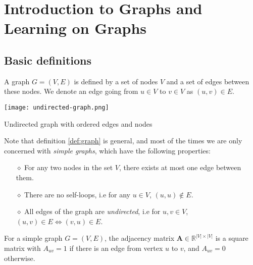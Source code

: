 \section{Introduction to Graphs and Learning on Graphs}\label{sec:intro-graph}
\subsection{Basic definitions}

\begin{definition}[Graph] \label{def:graph}
A graph $G = (V, E)$ is defined by a set of nodes $V$ and a set of edges between these nodes. We denote an edge going from $u \in V$ to $v \in V$ as $(u, v) \in E$.
\end{definition}
\begin{marginfigure}
	\texttt{[image: undirected-graph.png]}
	\caption{Undirected graph with ordered edges and nodes}
	\label{fig:undirected-graph}
\end{marginfigure}
Note that definition \ref{def:graph} is general, and most of the times we are only concerned with \textit{simple graphs}, which have the following properties:
\begin{itemize}
	\item[$\diamond$] For any two nodes in the set $V$, there exists at most one edge between them.
	\item[$\diamond$] There are no self-loops, i.e for any $u \in V$, $(u, u) \notin E$.
	\item[$\diamond$] All edges of the graph are \textit{undirected}, i.e for $u, v \in V$, $(u, v) \in E \Leftrightarrow (v, u) \in E$.
\end{itemize}
\begin{definition} \label{def:adjacency}
For a simple graph $G = (V, E)$, the adjacency matrix $\mathbf{A} \in \mathbb{R}^{|V| \times |V|}$ is a square matrix with $A_{uv} = 1$ if there is an edge from vertex $u$ to $v$, and $A_{uv} = 0$ otherwise.
\end{definition}
